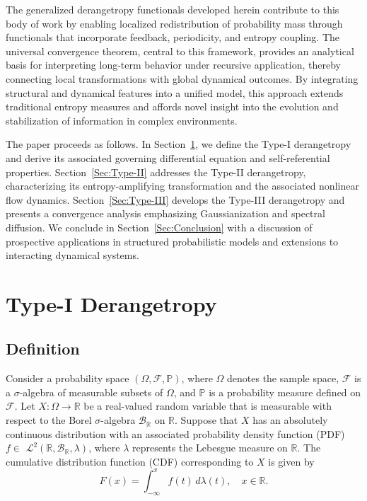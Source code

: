 \documentclass[sn-mathphys-num]{sn-jnl}%
\theoremstyle{thmstyleone}%
\theoremstyle{thmstyletwo}%
\theoremstyle{thmstylethree}%
\begin{document}
The generalized derangetropy functionals developed herein contribute to this body of work by enabling localized redistribution of probability mass through functionals that incorporate feedback, periodicity, and entropy coupling. The universal convergence theorem, central to this framework, provides an analytical basis for interpreting long-term behavior under recursive application, thereby connecting local transformations with global dynamical outcomes. By integrating structural and dynamical features into a unified model, this approach extends traditional entropy measures and affords novel insight into the evolution and stabilization of information in complex environments.

The paper proceeds as follows. In Section~\ref{Sec:Type-I}, we define the Type-I derangetropy and derive its associated governing differential equation and self-referential properties. Section~\ref{Sec:Type-II} addresses the Type-II derangetropy, characterizing its entropy-amplifying transformation and the associated nonlinear flow dynamics. Section~\ref{Sec:Type-III} develops the Type-III derangetropy and presents a convergence analysis emphasizing Gaussianization and spectral diffusion. We conclude in Section~\ref{Sec:Conclusion} with a discussion of prospective applications in structured probabilistic models and extensions to interacting dynamical systems.

\section{Type-I Derangetropy}
\label{Sec:Type-I}
\subsection{Definition}

Consider a probability space $(\Omega, \mathscr{F}, \mathbb{P})$, where $\Omega$ denotes the sample space, $\mathscr{F}$ is a $\sigma$-algebra of measurable subsets of $\Omega$, and $\mathbb{P}$ is a probability measure defined on $\mathscr{F}$. Let $X: \Omega \rightarrow \mathbb{R}$ be a real-valued random variable that is measurable with respect to the Borel $\sigma$-algebra $\mathscr{B}_{\mathbb{R}}$ on $\mathbb{R}$. Suppose that $X$ has an absolutely continuous distribution with an associated probability density function (PDF) $f \in$ $\mathcal{L}^2\left(\mathbb{R}, \mathscr{B}_{\mathbb{R}}, \lambda\right)$, where $\lambda$ represents the Lebesgue measure on $\mathbb{R}$. The cumulative distribution function (CDF) corresponding to $X$ is given by
\begin{equation*}
	F(x) = \int_{-\infty}^x f(t) \, d\lambda(t), \quad x \in \mathbb{R}.
\end{equation*}
\end{document}
